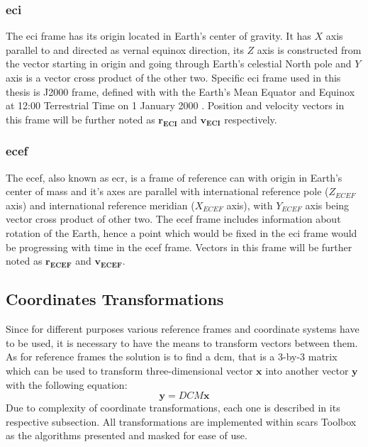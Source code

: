     \subsubsection{\ac*{eci}}
        The \ac{eci} frame has its origin located in Earth's center of gravity. It has $X$ axis parallel to and directed as vernal equinox direction, its $Z$ axis is constructed from the vector starting in origin and going through Earth's celestial North pole and $Y$ axis is a vector cross product of the other two. Specific \ac{eci} frame used in this thesis is J2000 frame, defined with with the Earth's Mean Equator and Equinox at 12:00 Terrestrial Time on 1 January 2000 \cite{schutz2004statistical}. Position and velocity vectors in this frame will be further noted as $\textbf{r}_\textbf{ECI}$ and $\textbf{v}_\textbf{ECI}$ respectively.

    \subsubsection{\ac*{ecef}}
        The \ac{ecef}, also known as \ac{ecr}, is a frame of reference can with origin in Earth's center of mass and it's axes are parallel with international reference pole ($Z_{ECEF}$ axis) and international reference meridian ($X_{ECEF}$ axis), with $Y_{ECEF}$ axis being vector cross product of other two. The \ac{ecef} frame includes information about rotation of the Earth, hence a point which would be fixed in the \ac{eci} frame would be progressing with time in the \ac{ecef} frame. Vectors in this frame will be further noted as $\textbf{r}_{\textbf{ECEF}}$ and $\textbf{v}_{\textbf{ECEF}}$.


\subsection{Coordinates Transformations}
    Since for different purposes various reference frames and coordinate systems have to be used, it is necessary to have the means to transform vectors between them. As for reference frames the solution is to find a \ac{dcm}, that is a 3-by-3 matrix which can be used to transform three-dimensional vector $\textbf{x}$ into another vector $\textbf{y}$ with the following equation:
    \begin{equation}
        \textbf{y} = DCM\textbf{x}
    \end{equation}
    Due to complexity of coordinate transformations, each one is described in its respective subsection. All transformations are implemented within \ac{scars} Toolbox as the algorithms presented and masked for ease of use.
    
